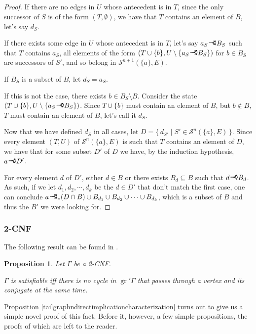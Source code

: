 \documentclass[11pt]{article}
\newcommand{\cS}{\mathcal{S}}
\DeclareMathOperator{\gr}{gr}
\newcommand{\rightcurveor}{
\!
\mathrel{
  \begin{tikzpicture}[scale=0.8]
    \draw[thick,->] (0,0) arc (90:150:-2ex);
    \draw[thick,->] (0,0) arc (90:30:2ex);
    \draw[thick] (-1ex, 0) -- (0.1ex,0);
  \end{tikzpicture}
}\!
}
\newtheorem*{prop*}{Proposition}
\begin{document}
\begin{proof}
If there are no edges in $U$ whose antecedent is in $T$, since the only successor of $S$ is of the form $(T, \emptyset)$, we have that $T$ contains an element of $B$, let's say $d_{S}$.

If there exists some edge in $U$ whose antecedent is in $T$, let's say $a_{S} \rightcurveor B_{S}$ such that $T$ contains $a_{S}$, all elements of the form $(T \cup \{b\}, U \setminus \{a_{S} \rightcurveor B_{S}\})$ for $b \in B_{S}$ are successors of $S'$, and so belong in $\cS^{n+1} (\{a\}, E)$.

If $B_S$ is a subset of $B$, let $d_S = a_S$.

If this is not the case, there exists $b \in B_S \setminus B$. Consider the state $(T \cup \{b\}, U \setminus \{a_{S} \rightcurveor B_{S}\})$. Since $T \cup \{b\}$ must contain an element of $B$, but $b \not \in B$, $T$ must contain an element of $B$, let's call it $d_S$.

Now that we have defined $d_S$ in all cases, let $D = \{\,d_{S'} \mid S' \in \cS^n (\{a\}, E)\,\}$. Since every element $(T, U)$ of $\cS^n (\{a\}, E)$ is such that $T$ contains an element of $D$, we have that for some subset $D'$ of $D$ we have, by the induction hypothesis, $a \rightcurveor D'$.

For every element $d$ of $D'$, either $d \in B$ or there exists $B_d \subseteq B$ such that $d \rightcurveor B_d$. As such, if we let $d_1, d_2, \cdots, d_k$ be the $d \in D'$ that don't match the first case, one can conclude $a \rightcurveor_* (D \cap B) \cup B_{d_1} \cup B_{d_2} \cup \cdots \cup B_{d_k}$, which is a subset of $B$ and thus the $B'$ we were looking for.

\end{proof}

\subsubsection{2-CNF}

The following result can be found in \cite{2cnf}.

\begin{prop*}
Let $\Gamma$ be a 2-CNF.

$\Gamma$ is satisfiable iff there is no cycle in $\gr' \Gamma$ that passes through a vertex and its conjugate at the same time.
\end{prop*}

Proposition \ref{tailgraphndirectimplicationcharacterization} turns out to give us a simple novel proof of this fact. Before it, however, a few simple propositions, the proofs of which are left to the reader.
\end{document}
